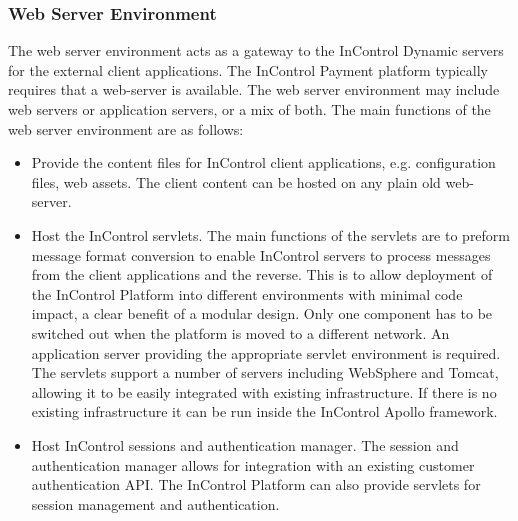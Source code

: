 \documentclass[a4paper, 11pt, titlepage]{article}
\begin{document}
\subsubsection{Web Server Environment} 
The web server environment acts as a gateway to the InControl Dynamic servers for the external client applications. The InControl Payment platform typically requires that a web-server is available. The web server environment may include web servers or application servers, or a mix of both. The main functions of the web server environment are as follows: 
\begin{itemize} 
\item Provide the content files for InControl client applications, e.g. configuration files, web assets. The client content can be hosted on any plain old web-server. 
\item Host the InControl servlets. The main functions of the servlets are to preform message format conversion to enable InControl servers to process messages from the client applications and the reverse. This is to allow deployment of the InControl Platform into different environments with minimal code impact, a clear benefit of a modular design. Only one component has to be switched out when the platform is moved to a different network. An application server providing the appropriate servlet environment is required. The servlets support a number of servers including WebSphere and Tomcat, allowing it to be easily integrated with existing infrastructure. If there is no existing infrastructure it can be run inside the InControl Apollo framework.  
\item Host InControl sessions and authentication manager. The session and authentication manager allows for integration with an existing customer authentication API. The InControl Platform can also provide servlets for session management and authentication. 
\end{itemize} 
\end{document}
